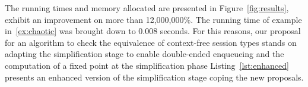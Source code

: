 The running times and memory allocated are presented in
Figure~\ref{fig:results}, exhibit an improvement on more than
12,000,000\%. The running time of example in~\eqref{ex:chaotic} was
brought down to 0.008 seconds. For this reasons, our
proposal for an algorithm to check the equivalence of context-free
session types stands on adapting the simplification stage to enable
double-ended enqueueing and the computation of a fixed point at the
simplification phase Listing~\ref{lst:enhanced} presents an enhanced
version of the simplification stage coping the new proposals.


